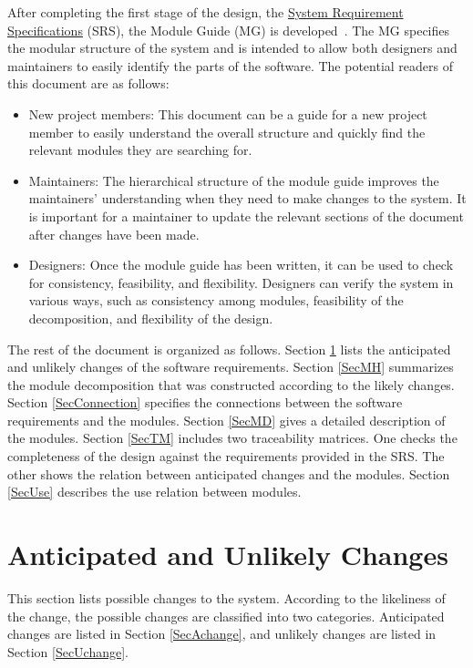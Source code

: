 \documentclass[12pt, titlepage]{article}
\begin{document}
After completing the first stage of the design, the \href{https://github.com/SammyG7/Mac-AR/blob/main/docs/SRS/SRS.pdf}{System Requirement Specifications} (SRS), the Module Guide (MG) is developed~\citep{ParnasEtAl1984}. The MG
specifies the modular structure of the system and is intended to allow both
designers and maintainers to easily identify the parts of the software.  The
potential readers of this document are as follows:

\begin{itemize}
\item New project members: This document can be a guide for a new project member
  to easily understand the overall structure and quickly find the
  relevant modules they are searching for.
\item Maintainers: The hierarchical structure of the module guide improves the
  maintainers' understanding when they need to make changes to the system. It is
  important for a maintainer to update the relevant sections of the document
  after changes have been made.
\item Designers: Once the module guide has been written, it can be used to
  check for consistency, feasibility, and flexibility. Designers can verify the
  system in various ways, such as consistency among modules, feasibility of the
  decomposition, and flexibility of the design.
\end{itemize}

The rest of the document is organized as follows. Section
\ref{SecChange} lists the anticipated and unlikely changes of the software
requirements. Section \ref{SecMH} summarizes the module decomposition that
was constructed according to the likely changes. Section \ref{SecConnection}
specifies the connections between the software requirements and the
modules. Section \ref{SecMD} gives a detailed description of the
modules. Section \ref{SecTM} includes two traceability matrices. One checks
the completeness of the design against the requirements provided in the SRS. The
other shows the relation between anticipated changes and the modules. Section
\ref{SecUse} describes the use relation between modules.

\section{Anticipated and Unlikely Changes} \label{SecChange}

This section lists possible changes to the system. According to the likeliness
of the change, the possible changes are classified into two
categories. Anticipated changes are listed in Section \ref{SecAchange}, and
unlikely changes are listed in Section \ref{SecUchange}.
\end{document}
